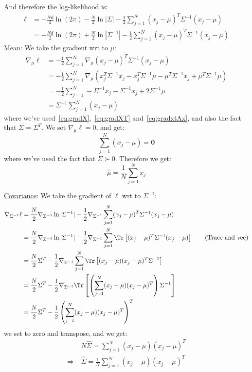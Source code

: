 \documentclass{article}
\begin{document}
And therefore the log-likelihood is:
\begin{align*}
  \ell &= - \frac{Nd}{2} \ln (2 \pi) - \frac{N}{2} \ln | \Sigma |  - \frac{1}{2} \sum_{j=1}^{N} (x_j- \mu)^{T} \Sigma ^{-1} (x_j - \mu) \\ 
  &= - \frac{Nd}{2} \ln (2 \pi) + \frac{N}{2} \ln | \Sigma ^{-1} |  - \frac{1}{2} \sum_{j=1}^{N} (x_j- \mu)^{T} \Sigma ^{-1} (x_j - \mu)
\end{align*}
\ul{Mean}: We take the gradient wrt to $\mu$:
\begin{align*}
  \nabla_{\mu} \ell &= -\frac{1}{2} \sum_{j=1}^{N} \nabla_{\mu} (x_j - \mu)^{T} \Sigma ^{-1}  (x_j - \mu) \\
  &= -\frac{1}{2} \sum_{j=1}^{N} \nabla_{\mu} \left( x_j ^{T} \Sigma ^{-1} x_j - x_j ^{T} \Sigma ^{-1}  \mu - \mu ^{T} \Sigma ^{-1}  x_j + \mu ^{T} \Sigma ^{-1}  \mu \right) \\
 &= -\frac{1}{2} \sum_{j=1}^{N} - \Sigma ^{-1} x_j - \Sigma ^{-1} x_j + 2 \Sigma ^{-1}  \mu \\
  &= \Sigma ^{-1}  \sum_{j=1}^{N} (x_j - \mu)
\end{align*}
where we've used~\cref{eq:gradX},~\cref{eq:gradXT} and~\cref{eq:gradxtAx}, and also the fact that $\Sigma = \Sigma ^{T}$. We set $\nabla_{\mu} \ell = 0$, and get:
\[
  \sum_{j=1}^{N} (x_j - \mu) = \bm{0}
\]
where we've used the fact that $\Sigma \succ 0$. Therefore we get:
\[
  \hat{\mu}  = \frac{1}{N} \sum_{j=1}^{N}x_j
\]


\ul{Covariance}: We take the gradient of $\ell$ wrt to $\Sigma^{-1}$:
\begin{align*}
  \nabla_{ \Sigma ^{-1} } \ell &= \frac{N}{2} \nabla_{ \Sigma ^{-1}  } \ln | \Sigma ^{-1}  | - \frac{1}{2} \nabla_{\Sigma ^{-1} }  \sum_{j=1}^{N} (x_j - \mu)^{T} \Sigma ^{-1} (x_j - \mu)  \\
  &= \frac{N}{2} \nabla_{ \Sigma ^{-1}  } \ln | \Sigma ^{-1}  | - \frac{1}{2} \nabla_{\Sigma ^{-1} }  \sum_{j=1}^{N} \Tr \left[ (x_j - \mu)^{T} \Sigma ^{-1} (x_j - \mu) \right]  \tag{Trace and vec}\\
  &= \frac{N}{2 } \Sigma ^{T} - \frac{1}{2}  \nabla_{ \Sigma ^{-1} }  \sum_{j=1}^{N} \Tr \left[ (x_j - \mu) (x_j - \mu)^{T} \Sigma ^{-1}  \right] \\ 
  &= \frac{N}{2 } \Sigma ^{T} - \frac{1}{2}  \nabla_{ \Sigma ^{-1} } \Tr \left[ \left( \sum_{j=1}^{N} (x_j-\mu) (x_j - \mu) ^{T} \right) \Sigma ^{-1}  \right]\\
  &= \frac{N}{2} \Sigma ^{T}  - \frac{1}{2 }\left( \sum_{j=1}^{N} (x_j - \mu) (x_j - \mu) ^{T}  \right) ^{T} 
\end{align*}
we set to zero and transpose, and we get:
\begin{align*}
  & N \hat{\Sigma} = \sum_{j=1}^{N} (x_j-\mu) (x_j- \mu) ^{T}  \\
  \Rightarrow \  & \hat{\Sigma}  = \frac{1}{N} \sum_{j=1}^{N} (x_j - \mu) (x_j - \mu)^{T} 
\end{align*}
\end{document}

